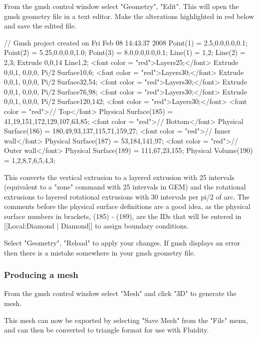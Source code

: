 From the gmsh control window select "Geometry", "Edit". This will open the gmsh geometry file in a text editor. Make the alterations highlighted in red below and save the edited file.

  // Gmsh project created on Fri Feb 08 14:43:37 2008
  Point(1) = {2.5,0.0,0.0,0.1};
  Point(2) = {5.25,0.0,0.0,1.0};
  Point(3) = {8.0,0.0,0.0,0.1};
  Line(1) = {1,2};
  Line(2) = {2,3};
  Extrude {0,0,14} {
    Line{1,2}; <font color = "red">Layers{25};</font>
  }
  Extrude {{0,0,1}, {0,0,0}, Pi/2} {
    Surface{10,6}; <font color = "red">Layers{30};</font>
  }Extrude {{0,0,1}, {0,0,0}, Pi/2} {
    Surface{32,54}; <font color = "red">Layers{30};</font>
  }
  Extrude {{0,0,1}, {0,0,0}, Pi/2} {
    Surface{76,98}; <font color = "red">Layers{30};</font>
  }
  Extrude {{0,0,1}, {0,0,0}, Pi/2} {
    Surface{120,142}; <font color = "red">Layers{30};</font>
  }
  <font color = "red">// Top</font>
  Physical Surface(185) = {41,19,151,172,129,107,63,85};
  <font color = "red">// Bottom</font>
  Physical Surface(186) = {180,49,93,137,115,71,159,27};
  <font color = "red">// Inner wall</font>
  Physical Surface(187) = {53,184,141,97};
  <font color = "red">// Outer wall</font>
  Physical Surface(189) = {111,67,23,155};
  Physical Volume(190) = {1,2,8,7,6,5,4,3};

This converts the vertical extrusion to a layered extrusion with 25 intervals (equivalent to a "zone" command with 25 intervals in GEM) and the rotational extrusions to layered rotational extrusions with 30 intervals per pi/2 of arc. The comments before the physical surface definitions are a good idea, as the physical surface numbers in brackets, (185) - (189), are the IDs that will be entered in [[Local:Diamond | Diamond]] to assign boundary conditions.

Select "Geometry", "Reload" to apply your changes. If gmsh displays an error then there is a mistake somewhere in your gmsh geometry file.

\subsubsection{Producing a mesh}

From the gmsh control window select "Mesh" and click "3D" to generate the mesh.


This mesh can now be exported by selecting "Save Mesh" from the "File" menu, and can then be converted to triangle format for use with Fluidity.



